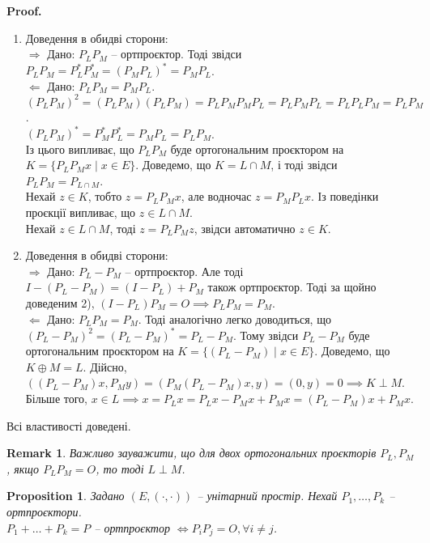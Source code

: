 \documentclass[a4paper, 10pt]{article}
\makeatletter
\def\rightproof{$\boxed{\Rightarrow}$ }
\def\leftproof{$\boxed{\Leftarrow}$ }
\theoremstyle{theoremdd}
\newtheorem{proposition}[theorem]{Proposition}
\newtheorem{remark}[theorem]{Remark}
\renewenvironment{proof}[1][Proof.\\]{\par
\pushQED{\hfill \qed}%
\normalfont \topsep6\p@\@plus6\p@\relax
\trivlist
\item\relax
{\bfseries
#1\@addpunct{.}}\hspace\labelsep\ignorespaces
}{%
\popQED\endtrivlist\@endpefalse
}
\makeatother
\begin{document}
\begin{proof}
\begin{enumerate}[wide=0pt,label={\arabic*)}]
\item Доведення в обидві сторони:\\
\rightproof Дано: $P_L P_M$ -- ортпроєктор. Тоді звідси $P_L P_M = P_L^* P_M^* = (P_M P_L)^* = P_M P_L$.
\bigskip \\
\leftproof Дано: $P_LP_M = P_MP_L$.\\
$(P_L P_M)^2 = (P_L P_M) (P_L P_M) = P_L P_M P_M P_L = P_L P_M P_L = P_L P_L P_M = P_L P_M$.\\
$(P_L P_M)^* = P_M^* P_L^* = P_M P_L = P_L P_M$.\\
Із цього випливає, що $P_LP_M$ буде ортогональним проєктором на $K = \{P_L P_M x \mid x \in E\}$. Доведемо, що $K = L \cap M$, і тоді звідси $P_L P_M = P_{L \cap M}$.\\
Нехай $z \in K$, тобто $z = P_LP_M x$, але водночас $z = P_MP_L x$. Із поведінки проєкції випливає, що $z \in L \cap M$.\\
Нехай $z \in L \cap M$, тоді $z = P_L P_M z$, звідси автоматично $z \in K$.

\item Доведення в обидві сторони:\\
\rightproof Дано: $P_L - P_M$ -- ортпроєктор. Але тоді $I - (P_L - P_M) = (I - P_L) + P_M$ також ортпроєктор. Тоді за щойно доведеним 2), $(I-P_L) P_M = O \implies P_LP_M = P_M$.
\bigskip \\
\leftproof Дано: $P_L P_M = P_M$. Тоді аналогічно легко доводиться, що $(P_L-P_M)^2 = (P_L-P_M)^* = P_L-P_M$. Тому звідси $P_L - P_M$ буде ортогональним проєктором на $K = \{(P_L-P_M) \mid x \in E\}$. Доведемо, що $K \oplus M = L$. Дійсно,\\
$((P_L-P_M)x,P_My) = (P_M(P_L-P_M)x,y) = (0,y) = 0 \implies K \perp M$. Більше того, $x \in L \implies x = P_L x = P_L x - P_M x + P_M x = (P_L - P_M)x + P_M x$.
\end{enumerate}
Всі властивості доведені.
\end{proof}

\begin{remark}
Важливо зауважити, що для двох ортогональних проєкторів $P_L,P_M$, якщо $P_L P_M = O$, то тоді $L \perp M$.
\end{remark}

\begin{proposition}
Задано $(E,(\cdot,\cdot))$ -- унітарний простір. Нехай $P_1,\dots,P_k$ -- ортпроєктори. \\
$P_1 + \dots + P_k = P$ -- ортпроєктор $\iff P_i P_j = O, \forall i \neq j$.
\end{proposition}
\end{document}

